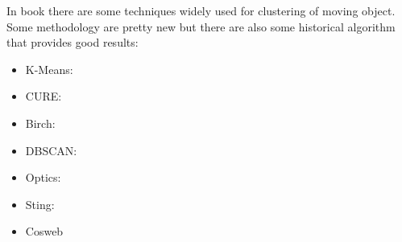 In \cite{AIReview} book there are some techniques widely used for clustering of moving object. Some methodology are pretty new but there are also some historical algorithm that provides good results: 
\begin{itemize}
	\item K-Means: 
	\item CURE:
	\item Birch:
	\item DBSCAN:
	\item Optics:
	\item Sting:
	\item Cosweb
\end{itemize}